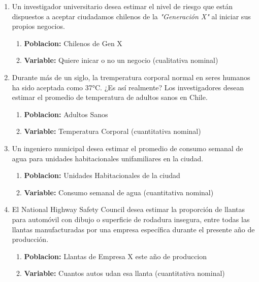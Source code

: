 \documentclass[12pt, letterpaper]{article}
\begin{document}
\begin{enumerate}
    \item Un investigador universitario desea estimar el nivel de riesgo que están dispuestos a aceptar ciudadamos chilenos de la \textit{"Generación X"} al iniciar sus propios negocios.
        \begin{enumerate}
            \item \textbf{Poblacion:} Chilenos de Gen X
            \item \textbf{Variable:} Quiere inicar o no un negocio (cualitativa nominal) \\
        \end{enumerate}
 
    \item Durante más de un siglo, la tremperatura corporal normal en seres humanos ha sido aceptada como 37°C. ¿Es así realmente? Los investigadores desean estimar el promedio de temperatura de adultos sanos en Chile.
        \begin{enumerate}
            \item \textbf{Poblacion:} Adultos Sanos
            \item \textbf{Variable:} Temperatura Corporal (cuantitativa nominal) \\
        \end{enumerate}

    \item Un ingeniero municipal desea estimar el promedio de consumo semanal de agua para unidades habitacionales unifamiliares en la ciudad.
        \begin{enumerate}
            \item \textbf{Poblacion:} Unidades Habitacionales de la ciudad
            \item \textbf{Variable:} Consumo semanal de agua (cuantitativa nominal) \\
        \end{enumerate}
    \item El National Highway Safety Council desea estimar la proporción de llantas para automóvil con dibujo o superficie de rodadura insegura, entre todas las llantas manufacturadas por una empresa específica durante el presente año de producción.
        \begin{enumerate}
            \item \textbf{Poblacion:} Llantas de Empresa X este año de produccion
            \item \textbf{Variable:} Cuantos autos udan esa llanta (cuantitativa nominal) \\
        \end{enumerate}


\end{enumerate}
\end{document}
